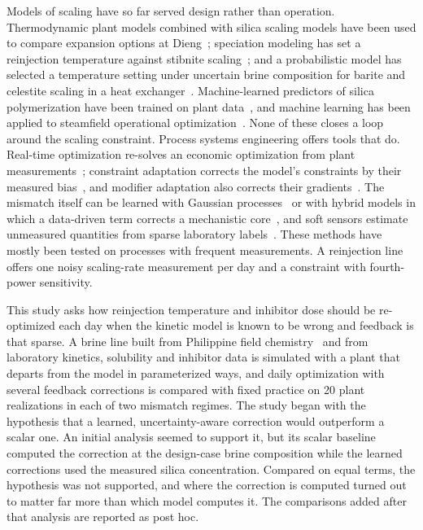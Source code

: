 Models of scaling have so far served design rather than operation.
Thermodynamic plant models combined with silica scaling models have
been used to compare expansion options at
Dieng~\citep{pambudi2018sustainability}; speciation modeling has set a
reinjection temperature against stibnite
scaling~\citep{tonkul2021characterization}; and a probabilistic model
has selected a temperature setting under uncertain brine composition
for barite and celestite scaling in a heat
exchanger~\citep{omrani2025probabilistic}. Machine-learned predictors of
silica polymerization have been trained on plant
data~\citep{juhri2024sgw}, and machine learning has been applied to
steamfield operational optimization~\citep{buster2021gooml}. None of
these closes a loop around the scaling constraint. Process systems
engineering offers tools that do. Real-time optimization re-solves an
economic optimization from plant measurements~\citep{darby2011rto};
constraint adaptation corrects the model's constraints by their measured
bias~\citep{chachuat2008constraint}, and modifier adaptation also
corrects their gradients~\citep{marchetti2009modifier,%
marchetti2016review}. The mismatch itself can be learned with Gaussian
processes~\citep{ferreira2018gpma,delriochanona2021tale} or with hybrid
models in which a data-driven term corrects a mechanistic
core~\citep{psichogios1992hybrid,vonstosch2014hybrid,sansana2021hybrid},
and soft sensors estimate unmeasured quantities from sparse laboratory
labels~\citep{kadlec2009data}. These methods have mostly been tested on
processes with frequent measurements. A reinjection line offers one
noisy scaling-rate measurement per day and a constraint with
fourth-power sensitivity.

This study asks how reinjection temperature and inhibitor dose should
be re-optimized each day when the kinetic model is known to be wrong
and feedback is that sparse. A brine line built from Philippine field
chemistry~\citep{sugiaman2004geochemical} and from laboratory kinetics,
solubility and inhibitor data is simulated with a plant that departs
from the model in parameterized ways, and daily optimization with
several feedback corrections is compared with fixed practice on 20
plant realizations in each of two mismatch regimes. The study began
with the hypothesis that a learned, uncertainty-aware correction would
outperform a scalar one. An initial analysis seemed to support it, but
its scalar baseline computed the correction at the design-case brine
composition while the learned corrections used the measured silica
concentration. Compared on equal terms, the hypothesis was not
supported, and where the correction is computed turned out to matter
far more than which model computes it. The comparisons added after that
analysis are reported as post hoc.

